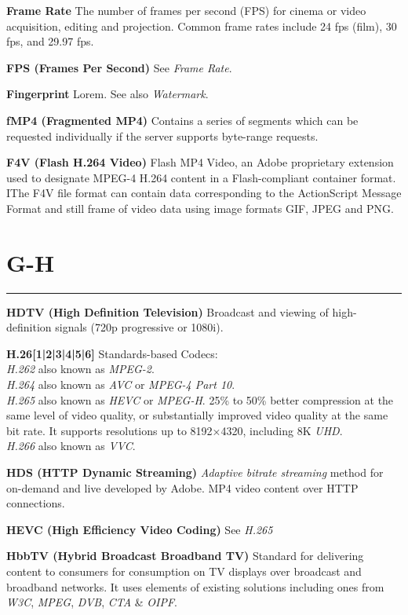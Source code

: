\textbf{Frame Rate}
The number of frames per second (FPS) for cinema or video acquisition, editing and projection. Common frame rates include 24 fps (film), 30 fps, and 29.97 fps.

\textbf{FPS (Frames Per Second)}
See \textit{Frame Rate}.

\smallskip
\textbf{Fingerprint}
Lorem. See also \textit{Watermark}.

\smallskip
\textbf{fMP4 (Fragmented MP4)}
Contains a series of segments which can be requested individually if the server supports byte-range requests.

\smallskip
\textbf{F4V (Flash H.264 Video)}
Flash MP4 Video, an Adobe proprietary extension used to designate MPEG-4 H.264 content in a Flash-compliant container format. IThe F4V file format can contain data corresponding to the ActionScript Message Format and still frame of video data using image formats GIF, JPEG and PNG.

\section{G-H}
\hrule

\medskip
\textbf{HDTV (High Definition Television)}
Broadcast and viewing of high-definition signals (720p progressive or 1080i).

\smallskip
\textbf{H.26[1|2|3|4|5|6]}
Standards-based Codecs:\\
\textit{H.262} also known as \textit{MPEG-2}.\\
\textit{H.264} also known as \textit{AVC} or  \textit{MPEG-4 Part 10}.\\
\textit{H.265} also known as \textit{HEVC} or \textit{MPEG-H}. 25\% to 50\% better compression at the same level of video quality, or substantially improved video quality at the same bit rate. It supports resolutions up to 8192×4320, including 8K \textit{UHD}.\\
\textit{H.266} also known as \textit{VVC}.

\smallskip
\textbf{HDS (HTTP Dynamic Streaming)}
\textit{Adaptive bitrate streaming} method for on-demand and live developed by Adobe. MP4 video content over HTTP connections.

\smallskip
\textbf{HEVC (High Efficiency Video Coding)}
See \textit{H.265}

\smallskip
\textbf{HbbTV (Hybrid Broadcast Broadband TV)}
Standard for delivering content to consumers for consumption on TV displays over broadcast and broadband networks. It uses elements of existing solutions including ones from \textit{W3C}, \textit{MPEG}, \textit{DVB}, \textit{CTA} \& \textit{OIPF}.

